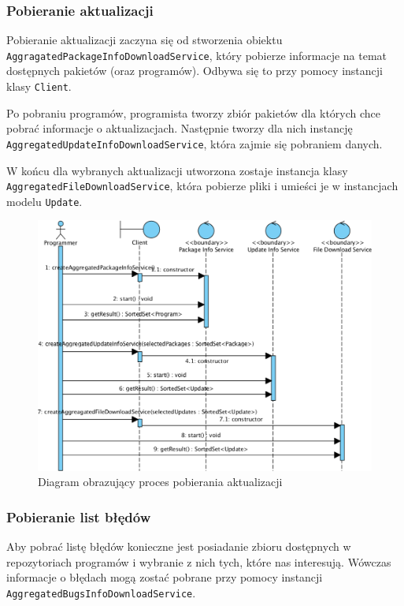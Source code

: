 \documentclass[polish,12pt,titlepage]{article}
\begin{document}
\subsubsection{Pobieranie aktualizacji}

Pobieranie aktualizacji zaczyna się od stworzenia obiektu
\texttt{AggragatedPackageInfoDownloadService}, który pobierze informacje na
temat dostępnych pakietów (oraz programów). Odbywa się to przy pomocy
instancji klasy \texttt{Client}.

Po pobraniu programów, programista tworzy zbiór pakietów dla których chce
pobrać informacje o aktualizacjach. Następnie tworzy dla nich instancję
\texttt{AggregatedUpdateInfoDownloadService}, która zajmie się pobraniem
danych.

W końcu dla wybranych aktualizacji utworzona zostaje instancja klasy
\texttt{AggregatedFileDownloadService}, która pobierze pliki i umieści je w
instancjach modelu \texttt{Update}.

\begin{figure}[!ht]
\centering
\includegraphics[bb=0 0 990 741, scale=0.40]{UpdateSequence.png}
\caption{Diagram obrazujący proces pobierania aktualizacji}
\end{figure}

\subsubsection{Pobieranie list błędów}

Aby pobrać listę błędów konieczne jest posiadanie zbioru dostępnych w
repozytoriach programów i wybranie z nich tych, które nas interesują.
Wówczas informacje o błędach mogą zostać pobrane przy pomocy instancji
\texttt{AggregatedBugsInfoDownloadService}.
\end{document}
